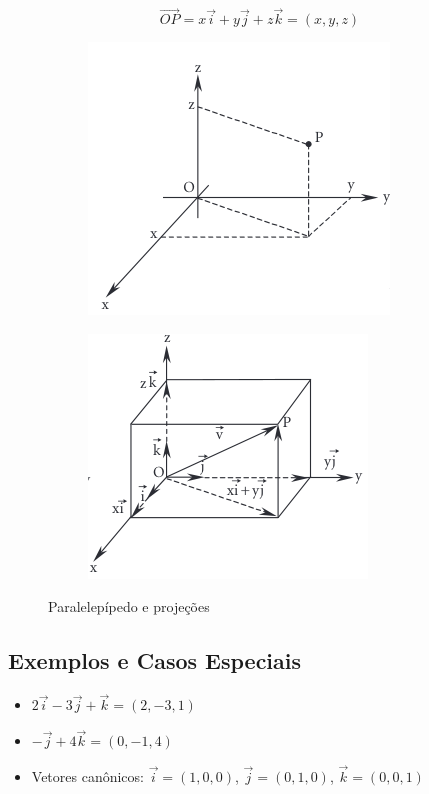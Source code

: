 \[
  \overrightarrow{OP} = x\vec{i} + y\vec{j} + z\vec{k} = (x,y,z)
\]

\begin{figure}[H]
  \centering
  \begin{subfigure}
    \centering
    \includegraphics[width=0.5\linewidth]{./fig/fig1.55a.png}\label{fig:fig1.55a}
  \end{subfigure}
  \hfill
  \centering
  \begin{subfigure}
    \centering
    \includegraphics[width=0.5\linewidth]{./fig/fig1.55b.png}\label{fig:fig1.55b}
  \end{subfigure}
  \caption{Paralelepípedo e projeções}
\end{figure}

\subsection{Exemplos e Casos Especiais}

\begin{itemize}
  \item $2\vec{i} - 3\vec{j} + \vec{k} = (2,-3,1)$
  \item $-\vec{j} + 4\vec{k} = (0,-1,4)$
  \item Vetores canônicos: $\vec{i}=(1,0,0)$, $\vec{j}=(0,1,0)$,
    $\vec{k}=(0,0,1)$
\end{itemize}

